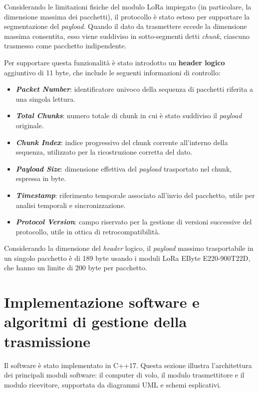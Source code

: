 \documentclass[12pt,a4paper,twoside]{book}
\begin{document}
Considerando le limitazioni fisiche del modulo \ac{LoRa} impiegato (in particolare,
la dimensione massima dei pacchetti), il protocollo è stato esteso per supportare
la segmentazione del \emph{payload}. Quando il dato da trasmettere eccede la dimensione
massima consentita, esso viene suddiviso in sotto-segmenti detti \emph{chunk},
ciascuno trasmesso come pacchetto indipendente.

Per supportare questa funzionalità è stato introdotto un \textbf{header logico}
aggiuntivo di 11 byte, che include le seguenti informazioni di controllo:

\begin{itemize}
    \item \textbf{\emph{Packet Number}}: identificatore univoco della sequenza di pacchetti riferita a una singola lettura.
    \item \textbf{\emph{Total Chunks}}: numero totale di chunk in cui è stato suddiviso il \emph{payload} originale.
    \item \textbf{\emph{Chunk Index}}: indice progressivo del chunk corrente all'interno della sequenza, utilizzato per la ricostruzione corretta del dato.
    \item \textbf{\emph{Payload Size}}: dimensione effettiva del \emph{payload} trasportato nel chunk, espressa in byte.
    \item \textbf{\emph{Timestamp}}: riferimento temporale associato all’invio del pacchetto, utile per analisi temporali e sincronizzazione.
    \item \textbf{\emph{Protocol Version}}: campo riservato per la gestione di versioni successive del protocollo, utile in ottica di retrocompatibilità.
\end{itemize} 

Considerando la dimensione del \emph{header} logico, il \emph{payload} massimo trasportabile in un singolo pacchetto
è di 189 byte usando i moduli \ac{LoRa} EByte E220-900T22D, che hanno un limite di 200 byte per pacchetto.

\section{Implementazione software e algoritmi di gestione della trasmissione}
Il software è stato implementato in C++17. Questa sezione illustra l'architettura
dei principali moduli software: il computer di volo, il modulo trasmettitore e
il modulo ricevitore, supportata da diagrammi UML e schemi esplicativi.
\end{document}
